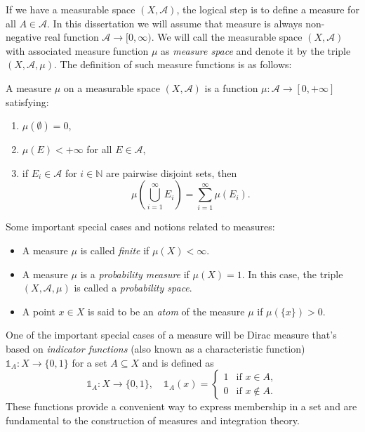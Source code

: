 If we have a measurable space $(X, \mathcal{A})$, the logical step is to define a measure for all $A \in \mathcal{A}$. In this dissertation we will assume that measure is always non-negative real function $\mathcal{A} \to [0, \infty)$. We will call the measurable space $(X,\mathcal{A})$ with associated measure function $\mu$ as \emph{measure space} and denote it by the triple $(X, \mathcal{A}, \mu)$. The definition of such measure functions is as follows:

\begin{definition}[Measure]
    A measure $\mu$ on a measurable space $(X, \mathcal{A})$ is a function $\mu: \mathcal{A} \to [0, +\infty]$ satisfying:
    \begin{enumerate}[label=(\roman*)]
        \item $\mu(\emptyset) = 0$,
        \item $\mu(E) < +\infty$ for all $E \in \mathcal{A}$,
        \item if $E_i \in \mathcal{A}$ for $i \in \mathbb{N}$ are pairwise disjoint sets, then
        \[
            \mu\left(\bigcup_{i=1}^\infty E_i\right) = \sum_{i=1}^\infty \mu(E_i).
        \]
    \end{enumerate}
\end{definition}

\begin{notenl}
    Some important special cases and notions related to measures:
    \begin{itemize}
        \item A measure $\mu$ is called \emph{finite} if $\mu(X) < \infty$.
        \item A measure $\mu$ is a \emph{probability measure} if $\mu(X) = 1$. In this case, the triple $(X, \mathcal{A}, \mu)$ is called a \emph{probability space}.
        \item A point $x \in X$ is said to be an \emph{atom} of the measure $\mu$ if $\mu(\{x\}) > 0$.
    \end{itemize}
\end{notenl}

One of the important special cases of a measure will be Dirac measure that's based on \emph{indicator functions} (also known as a characteristic function) $\mathds{1}_A: X \to \{0, 1\}$ for a set $A \subseteq X$ and is defined as
\begin{equation}
    \label{eq:indicator-function-def}
    \mathds{1}_A: X \to \{0, 1\}, \quad \mathds{1}_A(x) =
    \begin{cases}
        1 & \text{if } x \in A, \\
        0 & \text{if } x \notin A.
    \end{cases}
\end{equation}
These functions provide a convenient way to express membership in a set and are fundamental to the construction of measures and integration theory.



